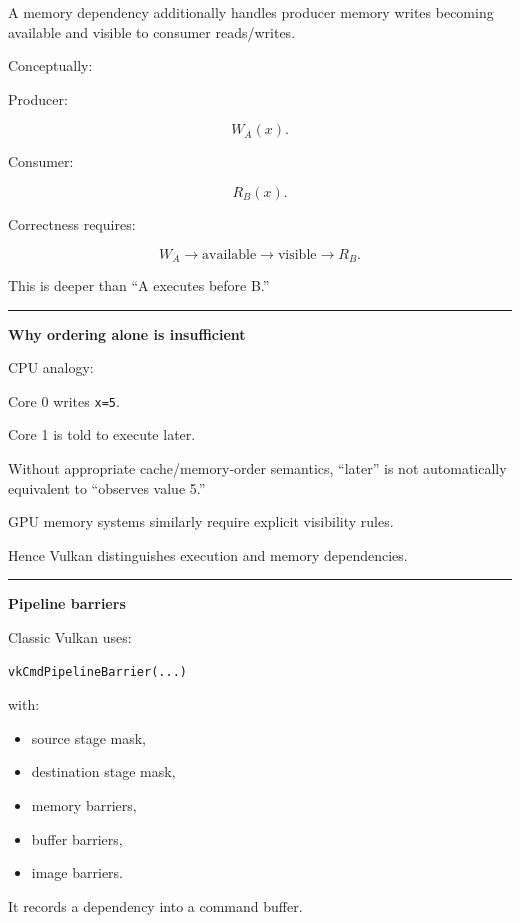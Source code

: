 A memory dependency additionally handles producer memory writes becoming available and visible to consumer reads/writes.

Conceptually:

Producer:

\[
W_A(x).
\]

Consumer:

\[
R_B(x).
\]

Correctness requires:

\[
\boxed{
W_A
\rightarrow
\text{available}
\rightarrow
\text{visible}
\rightarrow
R_B.
}
\]

This is deeper than ``A executes before B.''

\begin{center}\rule{0.5\linewidth}{0.5pt}\end{center}

\textbf{Why ordering alone is insufficient}

CPU analogy:

Core 0 writes \texttt{x=5}.

Core 1 is told to execute later.

Without appropriate cache/memory-order semantics, ``later'' is not automatically equivalent to ``observes value 5.''

GPU memory systems similarly require explicit visibility rules.

Hence Vulkan distinguishes execution and memory dependencies.

\begin{center}\rule{0.5\linewidth}{0.5pt}\end{center}

\textbf{Pipeline barriers}

Classic Vulkan uses:

\begin{verbatim}
vkCmdPipelineBarrier(...)
\end{verbatim}

with:

\begin{itemize}
\tightlist
\item
  source stage mask,
\item
  destination stage mask,
\item
  memory barriers,
\item
  buffer barriers,
\item
  image barriers.
\end{itemize}

It records a dependency into a command buffer.

